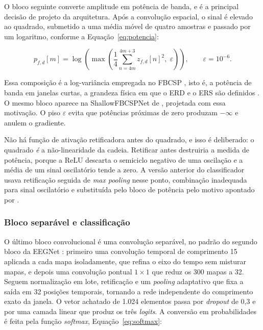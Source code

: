 \documentclass[12pt,a4paper]{article}
\newcommand{\citeonline}[1]{\cite{#1}}
\begin{document}
O bloco seguinte converte amplitude em potência de banda, e é a principal decisão de projeto
da arquitetura. Após a convolução
espacial, o sinal é elevado ao quadrado, submetido a uma média móvel de quatro amostras e
passado por um logaritmo, conforme a Equação~\ref{eq:potencia}:

\begin{equation}\label{eq:potencia}
p_{f,d}[m] = \log\!\left( \max\!\left( \frac{1}{4} \sum_{n=4m}^{4m+3} z_{f,d}[n]^{2},\; \varepsilon \right) \right), \qquad \varepsilon = 10^{-6}.
\end{equation}

Essa composição é a log-variância empregada no FBCSP \cite{ang2008}, isto é, a potência de
banda em janelas curtas, a grandeza física em que o ERD e o ERS são definidos
\cite{pfurtscheller1999}. O mesmo bloco aparece na ShallowFBCSPNet de
\citeonline{schirrmeister2017}, projetada com essa motivação. O piso $\varepsilon$ evita que
potências próximas de zero produzam $-\infty$ e anulem o gradiente.

Não há função de ativação retificadora antes do quadrado, e isso é deliberado: o quadrado
\emph{é} a não-linearidade da cadeia. Retificar antes destruiria a medida de potência, porque
a ReLU descarta o semiciclo negativo de uma oscilação e a média de um sinal oscilatório tende
a zero. A versão anterior do classificador usava retificação seguida de \textit{max pooling}
nesse ponto, combinação inadequada para sinal oscilatório e substituída pelo bloco de potência
pelo motivo apontado por \citeonline{schirrmeister2017}.

\subsubsection{Bloco separável e classificação}

O último bloco convolucional é uma convolução separável, no padrão do segundo bloco da EEGNet
\cite{lawhern2018}: primeiro uma convolução temporal de comprimento 15 aplicada a cada mapa
isoladamente, que refina o eixo do tempo sem misturar mapas, e depois uma convolução pontual
$1\times1$ que reduz os 300 mapas a 32. Seguem normalização em lote, retificação e um
\textit{pooling} adaptativo que fixa a saída em 32 posições temporais, tornando a rede
independente do comprimento exato da janela. O vetor achatado de 1.024 elementos passa por
\textit{dropout} de 0,3 e por uma camada linear que produz os três \textit{logits}. A
conversão em probabilidades é feita pela função \textit{softmax}, Equação~\ref{eq:softmax}:
\end{document}
